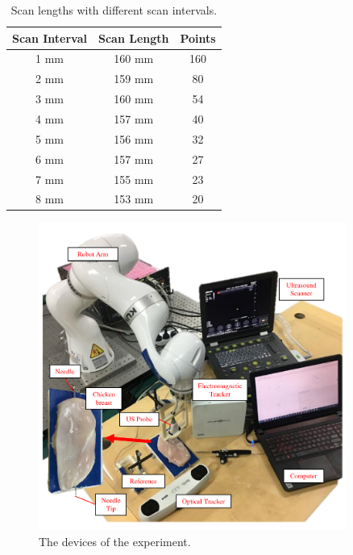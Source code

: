 \documentclass[journal,article,submit,moreauthors,pdftex]{Definitions/mdpi}
\begin{document}
\begin{table}[H]
\caption{Scan lengths with different scan intervals.}
\centering
\begin{tabular}{ccc}
\rowcolor{gray!40}\textbf{Scan Interval}  & \textbf{Scan Length}  & \textbf{Points}\\
\hline 1 mm    & 160 mm    & 160\\
\hline 2 mm    & 159 mm    & 80\\
\hline 3 mm    & 160 mm    & 54\\
\hline 4 mm    & 157 mm    & 40\\
\hline 5 mm    & 156 mm    & 32\\
\hline 6 mm    & 157 mm    & 27\\
\hline 7 mm    & 155 mm    & 23\\
\hline 8 mm    & 153 mm    & 20\\
\bottomrule
\end{tabular}
\end{table}

\begin{figure}[H]
\centering
\includegraphics[width=0.9\textwidth]{figures/2/f6.pdf}
\captionsetup{width=16 cm,justification=centering}
\caption{The devices of the experiment.}\label{fig:6}
\end{figure}
\end{document}
